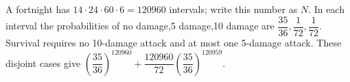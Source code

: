 A fortnight has $14\cdot24\cdot60\cdot6=120960$ intervals; write this number as $N$. In each interval the probabilities of no damage,5 damage,10 damage are $\dfrac{35}{36},\dfrac{1}{72},\dfrac{1}{72}$. Survival requires no 10-damage attack and at most one 5-damage attack. These disjoint cases give $\boxed{(\dfrac{35}{36})^{120960}+\dfrac{120960}{72}(\dfrac{35}{36})^{120959}}$.
